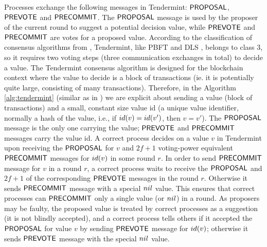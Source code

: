 Processes exchange the following messages in Tendermint: $\mathsf{PROPOSAL}$, $\mathsf{PREVOTE}$ and $\mathsf{PRECOMMIT}$. The 
$\mathsf{PROPOSAL}$ message is used by the proposer of the current round to suggest a potential decision value, while 
$\mathsf{PREVOTE}$ and $\mathsf{PRECOMMIT}$ are votes for a proposed value. According to the classification of consensus algorithms from \cite{RMS10:dsn}, Tendermint, like PBFT \cite{CL02:tcs} and DLS \cite{DLS88:jacm}, belongs to class 3, so it requires two voting steps (three communication exchanges in total) to decide a value. The Tendermint consensus algorithm is designed for the blockchain context where the value to decide is a block of transactions (ie. it is potentially quite large, consisting of many transactions). Therefore, in the Algorithm \ref{alg:tendermint} (similar as in \cite{CL02:tcs}) we are explicit about sending a value (block of transactions) and a small, constant size value id (a unique value identifier, normally a hash of the value, i.e., if $id(v) = id(v')$, then $v=v'$). The $\mathsf{PROPOSAL}$ message is the only one carrying the value; $\mathsf{PREVOTE}$ and $\mathsf{PRECOMMIT}$ messages carry the value id. 
A correct process decides on a value $v$ in Tendermint upon receiving the $\mathsf{PROPOSAL}$ for $v$ and $2f+1$ voting-power equivalent $\mathsf{PRECOMMIT}$ messages for $id(v)$ in some round $r$. In order to send $\mathsf{PRECOMMIT}$ message for $v$ in a round $r$, a correct process waits to receive the $\mathsf{PROPOSAL}$ and $2f+1$ of the corresponding $\mathsf{PREVOTE}$ messages in the round $r$. Otherwise it sends $\mathsf{PRECOMMIT}$ message with a special $nil$ value.  This ensures that correct processes can $\mathsf{PRECOMMIT}$ only a single value (or $nil$) in a round. 
As proposers may be faulty, the proposed value is treated by correct processes as a suggestion (it is not blindly accepted), and a correct process tells others if it accepted the $\mathsf{PROPOSAL}$ for value $v$ by sending $\mathsf{PREVOTE}$ message for $id(v)$; otherwise it sends $\mathsf{PREVOTE}$ message with the special $nil$ value. 

